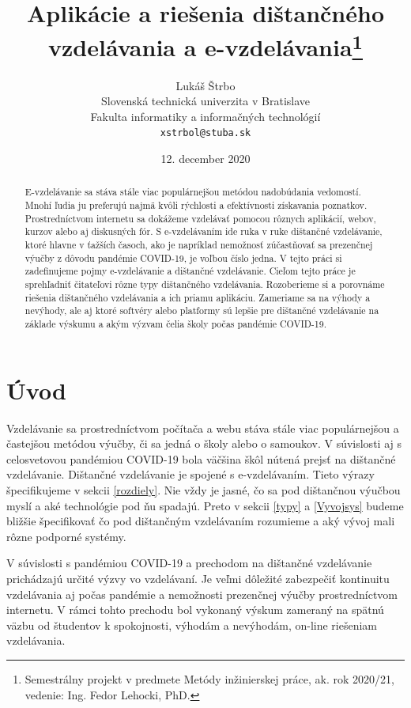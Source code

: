 \documentclass[10pt,oneside,slovak,a4paper]{article}
\title{Aplikácie a riešenia dištančného vzdelávania a e-vzdelávania\thanks{Semestrálny projekt v predmete Metódy inžinierskej práce, ak. rok 2020/21, vedenie: Ing. Fedor Lehocki, PhD.}}
\author{Lukáš Štrbo\\[2pt]
	{\small Slovenská technická univerzita v Bratislave}\\
	{\small Fakulta informatiky a informačných technológií}\\
	{\small \texttt{xstrbol@stuba.sk}}
	}
\date{\small 12. december 2020}
\begin{document}
\maketitle

\begin{abstract}
E-vzdelávanie sa stáva stále viac populárnejšou metódou nadobúdania vedomostí. Mnohí ľudia ju preferujú najmä kvôli rýchlosti a efektívnosti získavania poznatkov.
Prostredníctvom internetu sa dokážeme vzdelávať pomocou rôznych aplikácií, webov, kurzov alebo aj diskusných fór.
S e-vzdelávaním ide ruka v ruke dištančné vzdelávanie, ktoré hlavne v ťažších časoch, ako je napríklad nemožnosť zúčastňovať sa prezenčnej výučby z dôvodu pandémie COVID-19, 
 je voľbou číslo jedna. V tejto práci si zadefinujeme pojmy e-vzdelávanie a dištančné vzdelávanie. Cieľom tejto práce je sprehľadniť čitateľovi rôzne typy dištančného vzdelávania. Rozoberieme si a porovnáme riešenia dištančného vzdelávania a ich priamu
 aplikáciu. Zameriame sa na výhody a nevýhody, ale aj ktoré softvéry alebo platformy sú lepšie pre dištančné vzdelávanie na základe výskumu a akým výzvam čelia školy počas pandémie COVID-19.
\end{abstract}


\section*{Úvod} %
\label{uvod}
Vzdelávanie sa prostredníctvom počítača a webu stáva stále viac populárnejšou a častejšou metódou výučby, či sa jedná o školy alebo o samoukov. V súvislosti aj s celosvetovou pandémiou 
 COVID-19 bola väčšina škôl nútená prejsť na dištančné vzdelávanie. Dištančné vzdelávanie je spojené s e-vzdelávaním. Tieto výrazy špecifikujeme v sekcii \ref{rozdiely}.  
 Nie vždy je jasné, čo sa pod dištančnou výučbou myslí a aké technológie pod ňu spadajú. Preto v sekcii \ref{typy} a \ref{Vyvojsys} budeme bližšie špecifikovať čo pod dištančným vzdelávaním rozumieme a aký vývoj mali rôzne podporné systémy.
 
 V súvislosti s pandémiou COVID-19 a prechodom na dištančné vzdelávanie prichádzajú určité výzvy vo vzdelávaní.
 Je veľmi dôležité zabezpečiť kontinuitu vzdelávania aj počas pandémie a nemožnosti prezenčnej výučby prostredníctvom internetu. V rámci tohto prechodu bol vykonaný výskum zameraný na spätnú väzbu od študentov k spokojnosti, výhodám a nevýhodám, on-line riešeniam vzdelávania.
\end{document}
